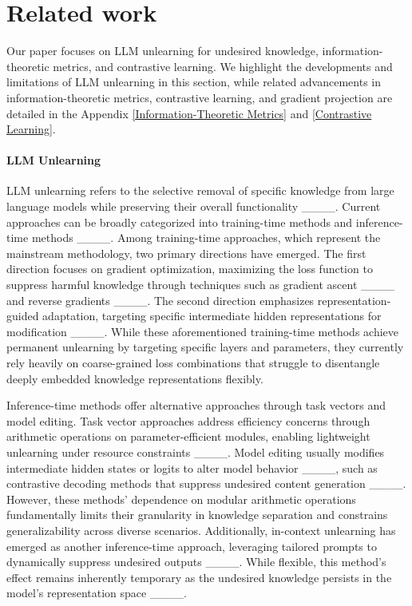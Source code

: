 \section{Related work}
Our paper focuses on LLM unlearning for undesired knowledge, information-theoretic metrics, and contrastive learning. We highlight the developments and limitations of LLM unlearning in this section, while related advancements in information-theoretic metrics, contrastive learning, and gradient projection are detailed in the Appendix \ref{Information-Theoretic Metrics} and \ref{Contrastive Learning}.
\paragraph{LLM Unlearning}
LLM unlearning refers to the selective removal of specific knowledge from large language models while preserving their overall functionality ____. Current approaches can be broadly categorized into training-time methods and inference-time methods ____. Among training-time approaches, which represent the mainstream methodology, two primary directions have emerged. The first direction focuses on gradient optimization, maximizing the loss function to suppress harmful knowledge through techniques such as gradient ascent ____ and reverse gradients ____. The second direction emphasizes representation-guided adaptation, targeting specific intermediate hidden representations for modification ____. While these aforementioned training-time methods achieve permanent unlearning by targeting specific layers and parameters, they currently rely heavily on coarse-grained loss combinations that struggle to disentangle deeply embedded knowledge representations flexibly.

Inference-time methods offer alternative approaches through task vectors and model editing. Task vector approaches address efficiency concerns through arithmetic operations on parameter-efficient modules, enabling lightweight unlearning under resource constraints ____. Model editing usually modifies intermediate hidden states or logits to alter model behavior ____, such as contrastive decoding methods that suppress undesired content generation ____. However, these methods' dependence on modular arithmetic operations fundamentally limits their granularity in knowledge separation and constrains generalizability across diverse scenarios. Additionally, in-context unlearning has emerged as another inference-time approach, leveraging tailored prompts to dynamically suppress undesired outputs ____. While flexible, this method's effect remains inherently temporary as the undesired knowledge persists in the model's representation space ____.

